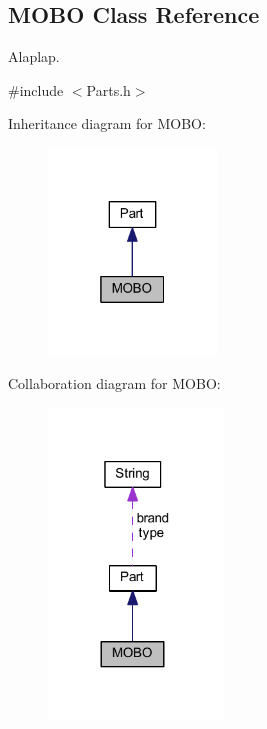 \hypertarget{class_m_o_b_o}{}\subsection{M\+O\+BO Class Reference}
\label{class_m_o_b_o}


Alaplap.  




{\ttfamily \#include $<$Parts.\+h$>$}



Inheritance diagram for M\+O\+BO\+:
\nopagebreak
\begin{figure}[H]
\begin{center}
\leavevmode
\includegraphics[width=127pt]{class_m_o_b_o__inherit__graph}
\end{center}
\end{figure}


Collaboration diagram for M\+O\+BO\+:
\nopagebreak
\begin{figure}[H]
\begin{center}
\leavevmode
\includegraphics[width=132pt]{class_m_o_b_o__coll__graph}
\end{center}
\end{figure}
